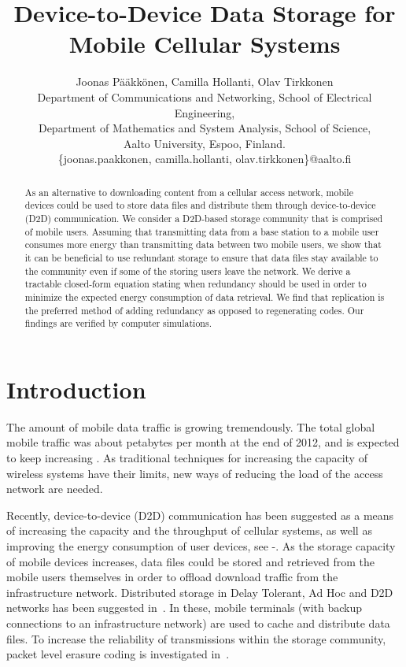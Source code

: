 \documentclass[10pt,conference]{IEEEtran}
\begin{document}
\title{Device-to-Device Data Storage for Mobile Cellular Systems}

\author{Joonas P\"a\"akk\"onen, Camilla Hollanti, Olav Tirkkonen
\\
Department of Communications and Networking, School of Electrical Engineering, \\
Department of Mathematics and System Analysis, School of Science, \\
Aalto University, Espoo, Finland. \\
\{joonas.paakkonen, camilla.hollanti, olav.tirkkonen\}@aalto.fi}

\maketitle

\begin{abstract}
As an alternative to downloading content from a cellular access
network, mobile devices could be used to store data files and distribute them
through device-to-device (D2D) communication. We consider a D2D-based
storage community that is comprised of mobile users. Assuming that transmitting data from a
base station to a mobile user consumes more energy than transmitting
data between two mobile users, we show that it can be beneficial to
use redundant storage to ensure that data files stay available to the
community even if some of the storing users leave the network. We derive a
tractable closed-form equation stating when redundancy should be used
in order to minimize the expected energy consumption of data
retrieval. We find that replication is the preferred method of adding
redundancy as opposed to regenerating codes. Our
findings are verified by computer simulations.
\end{abstract}

\section{Introduction}\label{introductionsec}

The amount of mobile data traffic is growing tremendously. The total
global mobile traffic was about  petabytes per month at the end
of 2012, and is expected to keep increasing \cite{cisco}. 
As traditional techniques for increasing the capacity of wireless
systems have their limits, new ways of reducing the load of the access
network are needed.

Recently, device-to-device (D2D) communication has been suggested as a
means of increasing the capacity and the throughput of cellular
systems, as well as improving the energy consumption of user devices,
see \cite{Kaufman}-\cite{belleschi}. As the storage capacity of
mobile devices increases, data files could be stored and retrieved from
the mobile users themselves in order to offload download traffic from the
infrastructure network. Distributed storage in Delay Tolerant, Ad Hoc
and D2D networks has been suggested
in~\cite{Ott2007,Lenders2007,golrezaei1}. In these, mobile terminals (with backup connections to an infrastructure network) are used to cache and distribute data files. To increase the
reliability of transmissions within the storage community, packet
level erasure coding is investigated in~\cite{pitkanen2007}.
\end{document}
